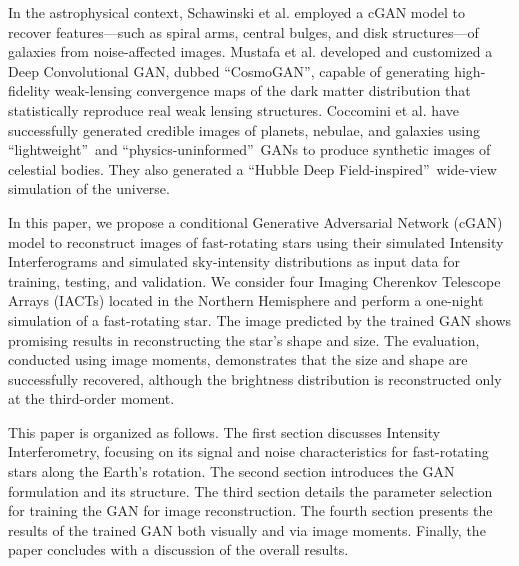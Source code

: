 In the astrophysical context, Schawinski et al. \cite{schawinski2017galaxypics} employed a cGAN model to recover features—such as spiral arms, central bulges, and disk structures—of galaxies from noise-affected images. Mustafa et al. \citep{mustafa2019cosmogan} developed and customized a Deep Convolutional GAN, dubbed \textquotedblleft CosmoGAN\textquotedblright, capable of generating high-fidelity weak-lensing convergence maps of the dark matter distribution that statistically reproduce real weak lensing structures. Coccomini et al. \citep{coccomini2021lightweightgan} have successfully generated credible images of planets, nebulae, and galaxies using \textquotedblleft lightweight\textquotedblright\ and \textquotedblleft physics-uninformed\textquotedblright\ GANs to produce synthetic images of celestial bodies. They also generated a \textquotedblleft Hubble Deep Field-inspired\textquotedblright\ wide-view simulation of the universe. 

In this paper, we propose a conditional Generative Adversarial Network (cGAN) model \citep{isola2017image} to reconstruct images of fast-rotating stars using their simulated Intensity Interferograms and simulated sky-intensity distributions as input data for training, testing, and validation. We consider four Imaging Cherenkov Telescope Arrays (IACTs) located in the Northern Hemisphere and perform a one-night simulation of a fast-rotating star. The image predicted by the trained GAN shows promising results in reconstructing the star’s shape and size. The evaluation, conducted using image moments, demonstrates that the size and shape are successfully recovered, although the brightness distribution is reconstructed only at the third-order moment.

This paper is organized as follows. The first section discusses Intensity Interferometry, focusing on its signal and noise characteristics for fast-rotating stars along the Earth’s rotation. The second section introduces the GAN formulation and its structure. The third section details the parameter selection for training the GAN for image reconstruction. The fourth section presents the results of the trained GAN both visually and via image moments. Finally, the paper concludes with a discussion of the overall results.